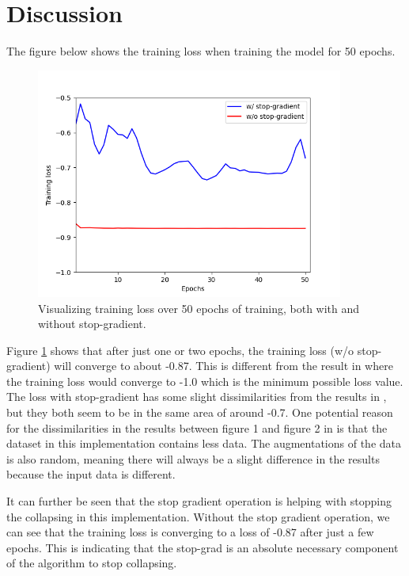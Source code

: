 \documentclass[12pt]{article}
\begin{document}
\section*{Discussion}
The figure below shows the training loss when training the model for 50 epochs.

\begin{figure}[h!]

    \centering
    \includegraphics*[width=0.9\textwidth]{figures/Figure_1.png}
    \caption{Visualizing training loss over 50 epochs of training, both with and without stop-gradient.}
    \label{results}
\end{figure}

Figure \ref{results} shows that after just one or two epochs, the training loss (w/o stop-gradient) will converge to about -0.87. This is different from
the result in \cite{chen2021exploring} where the training loss would converge to -1.0 which is the minimum possible loss value. The loss with
stop-gradient has some
slight dissimilarities from the results in \cite{chen2021exploring}, but they both seem to be in the same area of around -0.7. One potential reason for the
dissimilarities in the results between figure 1 and figure 2 in \cite{chen2021exploring} is that the dataset in this implementation contains less data. The 
augmentations of the data is also random, meaning there will always be a slight difference in the results because the input data is
different.

It can further be seen that the stop gradient operation is helping with stopping the collapsing in this implementation. Without the stop gradient
operation, we can see that the training loss is converging to a loss of -0.87 after just a few epochs. This is indicating
that the stop-grad is an absolute necessary component of the algorithm to stop collapsing.
\end{document}

